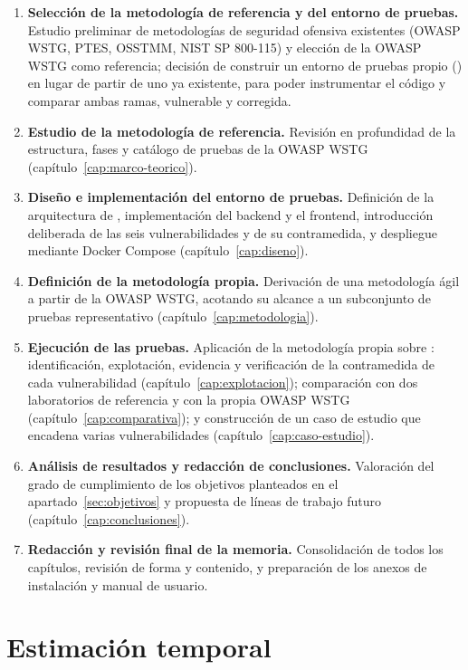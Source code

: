 \begin{enumerate}
\item \textbf{Selección de la metodología de referencia y del entorno de
  pruebas.} Estudio preliminar de metodologías de seguridad ofensiva
  existentes (OWASP WSTG, PTES, OSSTMM, NIST SP 800-115) y elección de la
  OWASP WSTG como referencia; decisión de construir un entorno de pruebas
  propio (\breachlab) en lugar de partir de uno ya existente, para poder
  instrumentar el código y comparar ambas ramas, vulnerable y corregida.
\item \textbf{Estudio de la metodología de referencia.} Revisión en
  profundidad de la estructura, fases y catálogo de pruebas de la OWASP
  WSTG (capítulo~\ref{cap:marco-teorico}).
\item \textbf{Diseño e implementación del entorno de pruebas.} Definición de
  la arquitectura de \breachlab, implementación del backend y el frontend,
  introducción deliberada de las seis vulnerabilidades y de su
  contramedida, y despliegue mediante Docker Compose
  (capítulo~\ref{cap:diseno}).
\item \textbf{Definición de la metodología propia.} Derivación de una
  metodología ágil a partir de la OWASP WSTG, acotando su alcance a un
  subconjunto de pruebas representativo (capítulo~\ref{cap:metodologia}).
\item \textbf{Ejecución de las pruebas.} Aplicación de la metodología propia
  sobre \breachlab: identificación, explotación, evidencia y verificación
  de la contramedida de cada vulnerabilidad (capítulo~\ref{cap:explotacion});
  comparación con dos laboratorios de referencia y con la propia OWASP WSTG
  (capítulo~\ref{cap:comparativa}); y construcción de un caso de estudio que
  encadena varias vulnerabilidades (capítulo~\ref{cap:caso-estudio}).
\item \textbf{Análisis de resultados y redacción de conclusiones.} Valoración
  del grado de cumplimiento de los objetivos planteados en el
  apartado~\ref{sec:objetivos} y propuesta de líneas de trabajo futuro
  (capítulo~\ref{cap:conclusiones}).
\item \textbf{Redacción y revisión final de la memoria.} Consolidación de
  todos los capítulos, revisión de forma y contenido, y preparación de los
  anexos de instalación y manual de usuario.
\end{enumerate}

\section{Estimación temporal}

